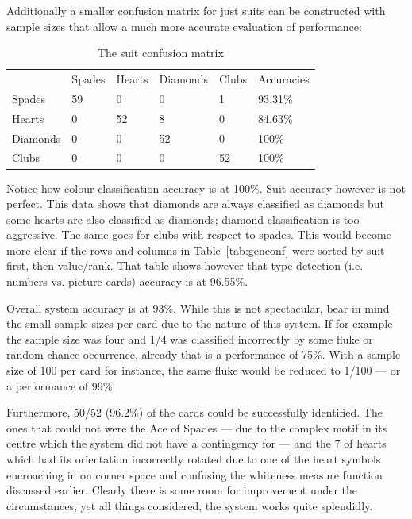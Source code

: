 \documentclass[a4paper,12pt,notitlepage]{article}
\begin{document}
	Additionally a smaller confusion matrix for just suits can be constructed with sample sizes that allow a much more accurate evaluation of performance:

	\begin{table}[H]
		\centering
		\caption{The suit confusion matrix}
		\label{tab:suitconf}
		\begin{tabular}{| l || l | l | l | l || l |}
			\hline
			         & Spades & Hearts & Diamonds & Clubs & Accuracies\\
			\hhline{|=|=|=|=|=|=|}
			Spades   & 59\cellcolor[gray]{0.9}  & 0  & 0  & 1\cellcolor[gray]{0.9}  & 93.31\% \\
			\hline
			Hearts   & 0  & 52\cellcolor[gray]{0.9}  & 8\cellcolor[gray]{0.9}  & 0  & 84.63\% \\
			\hline
			Diamonds & 0  & 0  & 52\cellcolor[gray]{0.9}  & 0  & 100\% \\
			\hline
			Clubs    & 0  & 0 & 0  & 52\cellcolor[gray]{0.9}  & 100\% \\
			\hline
		\end{tabular}
	\end{table}

	Notice how colour classification accuracy is at 100\%. Suit accuracy however is not perfect. This data shows that diamonds are always classified as diamonds but some hearts are also classified as diamonds; diamond classification is too aggressive. The same goes for clubs with respect to spades. This would become more clear if the rows and columns in Table~\ref{tab:genconf} were sorted by suit first, then value/rank. That table shows however that type detection (i.e. numbers vs. picture cards) accuracy is at 96.55\%.

	Overall system accuracy is at 93\%. While this is not spectacular, bear in mind the small sample sizes per card due to the nature of this system. If for example the sample size was four and 1/4 was classified incorrectly by some fluke or random chance occurrence, already that is a performance of 75\%. With a sample size of 100 per card for instance, the same fluke would be reduced to 1/100 --- or a performance of 99\%.

	Furthermore, 50/52 (96.2\%) of the cards could be successfully identified. The ones that could not were the Ace of Spades --- due to the complex motif in its centre which the system did not have a contingency for --- and the 7 of hearts which had its orientation incorrectly rotated due to one of the heart symbols encroaching in on corner space and confusing the whiteness measure function discussed earlier. Clearly there is some room for improvement under the circumstances, yet all things considered, the system works quite splendidly.
\end{document}
